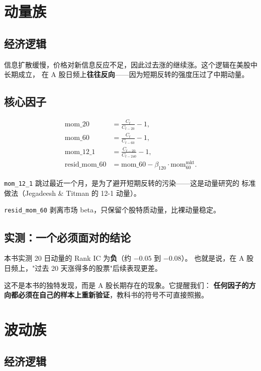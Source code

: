 \section{动量族}

\subsection{经济逻辑}

信息扩散缓慢，价格对新信息反应不足，因此过去涨的继续涨。这个逻辑在美股中长期成立，
在 A 股日频上\textbf{往往反向}——因为短期反转的强度压过了中期动量。

\subsection{核心因子}

\begin{align}
  \text{mom\_20} &= \frac{C_t}{C_{t-20}} - 1, \\
  \text{mom\_60} &= \frac{C_t}{C_{t-60}} - 1, \\
  \text{mom\_12\_1} &= \frac{C_{t-20}}{C_{t-240}} - 1, \\
  \text{resid\_mom\_60} &= \text{mom\_60} - \beta_{120}\cdot \text{mom}^{\text{mkt}}_{60}.
\end{align}

\texttt{mom\_12\_1} 跳过最近一个月，是为了避开短期反转的污染——这是动量研究的
标准做法（Jegadeesh \& Titman 的 12-1 动量）。

\texttt{resid\_mom\_60} 剥离市场 beta，只保留个股特质动量，比裸动量稳定。

\subsection{实测：一个必须面对的结论}

本书实测 20 日动量的 Rank IC 为\textbf{负}（约 $-0.05$ 到 $-0.08$）。
也就是说，在 A 股日频上，"过去 20 天涨得多的股票"后续表现更差。

这不是本书的独特发现，而是 A 股长期存在的现象。它提醒我们：
\textbf{任何因子的方向都必须在自己的样本上重新验证}，教科书的符号不可直接照搬。

\section{波动族}

\subsection{经济逻辑}


